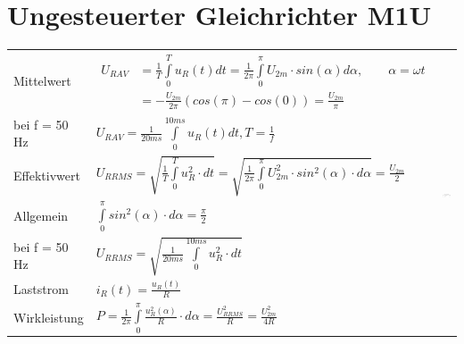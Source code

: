 \section{Ungesteuerter Gleichrichter M1U}


\begin{tabular}{|l|l|p{}}
\cline{1-2}
  Mittelwert
  	& $ \begin{aligned}
  			U_{R AV} &= \frac{1}{T}\int\limits_{0}^{T}u_{R}(t)dt = \frac{1}{2\pi}\int\limits_{0}^{\pi}U_{2m} \cdot sin(\alpha)d\alpha, \qquad \alpha = \omega t\\
  					&= -\frac{U_{2m}}{2\pi}(cos(\pi)-cos(0))= \frac{U_{2m}}{\pi}
  		\end{aligned}$
  	& \multirow{7}{*}{\includegraphics[width = \linewidth]{./pictures/m1u.png}}\\[8mm]
  	\cline{1-2}
  bei f = 50 Hz 
  	& $U_{R AV} = \frac{1}{20 ms}\int\limits_{0}^{10 ms}u_{R}(t)dt, T = \frac{1}{f}$ &\\
  	\cline{1-2}
  Effektivwert 
  	& $U_{R RMS} = \sqrt{\frac{1}{T}\int\limits_{0}^{T}u_{R}^2 \cdot dt} = \sqrt{\frac{1}{2\pi}\int\limits_{0}^{\pi}U_{2m}^2 \cdot sin^2(\alpha) \cdot d\alpha} = \frac{U_{2m}}{2}$ &\\
  	\cline{1-2}
  Allgemein 
  	& $\int\limits_{0}^{\pi}sin^2(\alpha) \cdot d\alpha = \frac{\pi}{2}$&\\
  	\cline{1-2}
  bei f = 50 Hz 
  	& $U_{R RMS} = \sqrt{\frac{1}{20 ms}\int\limits_{0}^{10 ms}u_{R}^2 \cdot dt}$&\\
  	\cline{1-2}
  Laststrom 
  	& $i_{R}(t) = \frac{u_{R}(t)}{R}$&\\
  	\cline{1-2}
  Wirkleistung 
  	& $P = \frac{1}{2\pi}\int\limits_{0}^{\pi}\frac{u_{R}^2(\alpha)}{R} \cdot d\alpha = \frac{U_{R RMS}^2}{R} = \frac{U_{2m}^2}{4R}$&\\
\cline{1-2}
\end{tabular}
